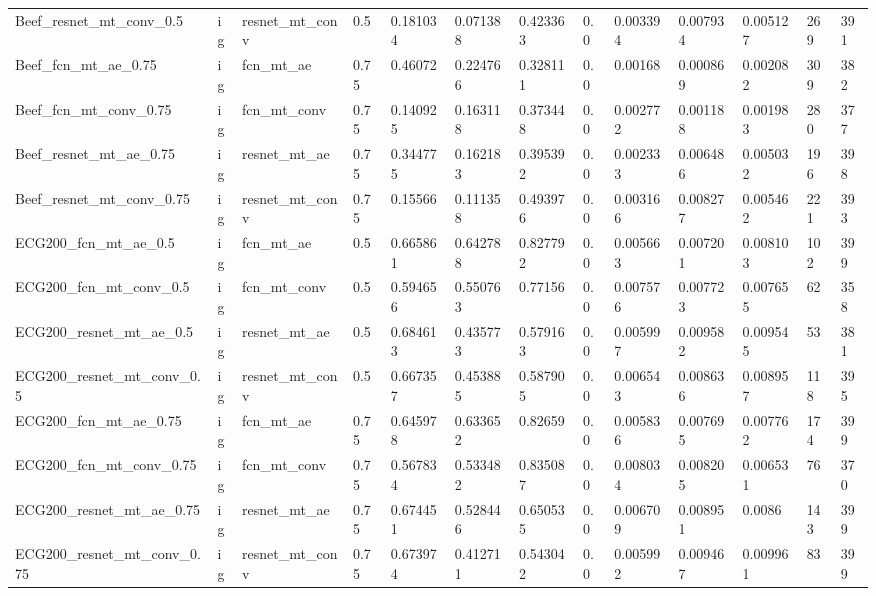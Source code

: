 \begin{tabular}{lllllllllllll}
Beef\_resnet\_mt\_conv\_0.5      &  ig &  resnet\_mt\_conv &   0.5 &  0.181034 &  0.071388 &  0.423363 &  0.0 &  0.003394 &  0.007934 &  0.005127 &          269 &          391 \\
Beef\_fcn\_mt\_ae\_0.75          &  ig &       fcn\_mt\_ae &  0.75 &   0.46072 &  0.224766 &  0.328111 &  0.0 &   0.00168 &  0.000869 &  0.002082 &          309 &          382 \\
Beef\_fcn\_mt\_conv\_0.75        &  ig &     fcn\_mt\_conv &  0.75 &  0.140925 &  0.163118 &  0.373448 &  0.0 &  0.002772 &  0.001188 &  0.001983 &          280 &          377 \\
Beef\_resnet\_mt\_ae\_0.75       &  ig &    resnet\_mt\_ae &  0.75 &  0.344775 &  0.162183 &  0.395392 &  0.0 &  0.002333 &  0.006486 &  0.005032 &          196 &          398 \\
Beef\_resnet\_mt\_conv\_0.75     &  ig &  resnet\_mt\_conv &  0.75 &   0.15566 &  0.111358 &  0.493976 &  0.0 &  0.003166 &  0.008277 &  0.005462 &          221 &          393 \\
ECG200\_fcn\_mt\_ae\_0.5         &  ig &       fcn\_mt\_ae &   0.5 &  0.665861 &  0.642788 &  0.827792 &  0.0 &  0.005663 &  0.007201 &  0.008103 &          102 &          399 \\
ECG200\_fcn\_mt\_conv\_0.5       &  ig &     fcn\_mt\_conv &   0.5 &  0.594656 &  0.550763 &   0.77156 &  0.0 &  0.007576 &  0.007723 &  0.007655 &           62 &          358 \\
ECG200\_resnet\_mt\_ae\_0.5      &  ig &    resnet\_mt\_ae &   0.5 &  0.684613 &  0.435773 &  0.579163 &  0.0 &  0.005997 &  0.009582 &  0.009545 &           53 &          381 \\
ECG200\_resnet\_mt\_conv\_0.5    &  ig &  resnet\_mt\_conv &   0.5 &  0.667357 &  0.453885 &  0.587905 &  0.0 &  0.006543 &  0.008636 &  0.008957 &          118 &          395 \\
ECG200\_fcn\_mt\_ae\_0.75        &  ig &       fcn\_mt\_ae &  0.75 &  0.645978 &  0.633652 &   0.82659 &  0.0 &  0.005836 &  0.007695 &  0.007762 &          174 &          399 \\
ECG200\_fcn\_mt\_conv\_0.75      &  ig &     fcn\_mt\_conv &  0.75 &  0.567834 &  0.533482 &  0.835087 &  0.0 &  0.008034 &  0.008205 &  0.006531 &           76 &          370 \\
ECG200\_resnet\_mt\_ae\_0.75     &  ig &    resnet\_mt\_ae &  0.75 &  0.674451 &  0.528446 &  0.650535 &  0.0 &  0.006709 &  0.008951 &    0.0086 &          143 &          399 \\
ECG200\_resnet\_mt\_conv\_0.75   &  ig &  resnet\_mt\_conv &  0.75 &  0.673974 &  0.412711 &  0.543042 &  0.0 &  0.005992 &  0.009467 &  0.009961 &           83 &          399 \\
\bottomrule
\end{tabular}
